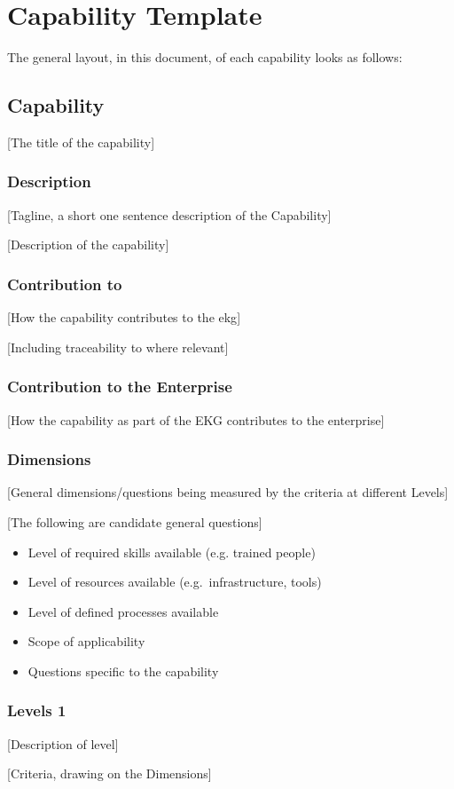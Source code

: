 \section{Capability Template}

The general layout, in this document, of each capability looks as follows:

\subsection*{Capability}

[The title of the capability]

\subsubsection*{Description}

[Tagline, a short one sentence description of the Capability]

[Description of the capability]

\subsubsection*{Contribution to }

[How the capability contributes to the \gls{ekg}]

[Including traceability to  where relevant]

\subsubsection*{Contribution to the Enterprise}

[How the capability as part of the EKG contributes to the enterprise]

\subsubsection*{Dimensions}

[General dimensions/questions being measured by the criteria at different Levels]

[The following are candidate general questions]

\begin{itemize}
    \item Level of required skills available (e.g. trained people)
    \item Level of resources available (e.g.\ infrastructure, tools)
    \item Level of defined processes available
    \item Scope of applicability
    \item Questions specific to the capability
\end{itemize}

\subsubsection*{Levels 1 }

[Description of level]

[Criteria, drawing on the Dimensions]
